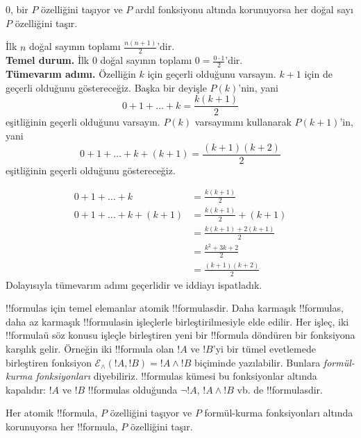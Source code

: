 \begin{defn}
$0$, bir $P$ özelliğini taşıyor ve $P$ ardıl fonksiyonu altında korunuyorsa
her doğal sayı $P$ özelliğini taşır.
\end{defn}

\begin{ex} İlk $n$ doğal sayının toplamı $\frac{n(n+1)}{2}$'dir. \\

\textbf{Temel durum.} İlk $0$ doğal sayının toplamı
$0=\frac{0\cdot 1}{2}$'dir.\\

\textbf{Tümevarım adımı.} Özelliğin $k$ için geçerli olduğunu varsayın.
$k+1$ için de geçerli olduğunu göstereceğiz. Başka bir deyişle $P(k)$'nin,
yani
\[ 0 + 1 + \ldots + k = \frac{k(k+1)}{2} \]
eşitliğinin geçerli olduğunu varsayın. $P(k)$ varsayımını kullanarak
$P(k+1)$'in, yani
\[ 0 + 1 + \ldots + k + (k+1) = \frac{(k+1)(k+2)}{2} \]
eşitliğinin geçerli olduğunu göstereceğiz.

\begin{align*}
0 + 1 + \ldots + k &= \frac{k(k+1)}{2} \tag{Varsayım} \\
0 + 1 + \ldots + k + (k+1) &= \frac{k(k+1)}{2} + (k+1)
\tag{Her iki tarafa $k+1$ ekleyin} \\
&= \frac{k(k+1) + 2(k+1)}{2} \\
&= \frac{k^2 + 3k +2}{2} \\
&=\frac{(k+1)(k+2)}{2}
\end{align*}
Dolayısıyla tümevarım adımı geçerlidir ve iddiayı ispatladık.
\end{ex}

\begin{explain}
!!{formula}s için temel elemanlar atomik !!{formula}s{}dir. Daha karmaşık
!!{formula}s, daha az karmaşık !!{formula}s{}in işleçlerle birleştirilmesiyle
elde edilir. Her işleç, iki !!{formula}{}ü söz konusu işleçle birleştiren yeni
bir !!{formula} döndüren bir fonksiyona karşılık gelir. Örneğin iki
!!{formula} olan $!A$ ve $!B$'yi bir tümel evetlemede birleştiren fonksiyon
$\mathcal E _\land (!A, !B) = !A \land !B$ biçiminde yazılabilir. Bunlara
\emph{formül-kurma fonksiyonları} diyebiliriz. !!{formula}s kümesi bu
fonksiyonlar altında kapalıdır: $!A$ ve $!B$ !!{formula}s olduğunda
$\lnot !A$, $!A \land !B$ vb. de !!{formula}s{}dir.
\end{explain}

\begin{defn}
Her atomik !!{formula}, $P$ özelliğini taşıyor ve $P$ formül-kurma
fonksiyonları altında korunuyorsa her !!{formula}, $P$ özelliğini taşır.
\end{defn}

